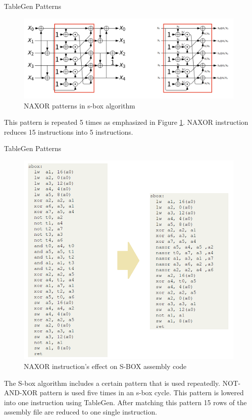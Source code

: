 \begin{frame}[fragile]{TableGen Patterns}
\begin{figure}
    \centering
    \includegraphics[scale=0.3]{sbox_naxor_pattern.png}
    \caption{NAXOR patterns in s-box algorithm}
    \label{fig:sbox_naxor_pattern}
\end{figure}
This pattern is repeated 5 times as emphasized in Figure \ref{fig:sbox_naxor_pattern}. NAXOR instruction reduces 15 instructions into 5 instructions.
\end{frame}



\begin{frame}[fragile]{TableGen Patterns}
\begin{figure}
    \centering
    \includegraphics[scale=0.3]{naxor_instruction.png}
    \caption{NAXOR instruction's effect on S-BOX assembly code}
    \label{fig:sbox_instruction}
\end{figure}
The S-box algorithm includes a certain pattern that is used repeatedly.
NOT-AND-XOR pattern is used five times in an s-box cycle. This pattern is lowered
into one instruction using TableGen. After matching this pattern 15 rows of the
assembly file are reduced to one single instruction.
\end{frame}
